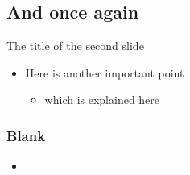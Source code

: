 \subsection{And once again}
\begin{frame}{The title of the second slide}
  \begin{itemize}
    \item Here is another important point
      \begin{itemize}
        \item which is explained here
      \end{itemize}
  \end{itemize}
\end{frame}

\begin{frame}[fragile]
%
  \frametitle{Blank}
%
  \begin{itemize}
%
  \item 
%
  \end{itemize}
%
\end{frame}

